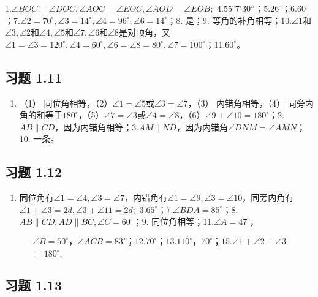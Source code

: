 1.\(\angle BOC = \angle DOC, \angle AOC = \angle EOC, \angle AOD = \angle EOB;\)
4.\(55^{\circ}7'30''\)；5.\(26^{\circ}\)；6.\(60^{\circ}\)；7.\(\angle 2 = 70^{\circ}, \angle 3 = 14^{\circ}, \angle 4 = 96^{\circ}, \angle 6 = 14^{\circ}\)；8.
是；9.
等角的补角相等；10.\(\angle 1\)和\(\angle 3, \angle 2\)和\(\angle 4, \angle 5\)和\(\angle 7, \angle 6\)和\(\angle 8\)是对顶角，又\(\angle 1 = \angle 3 = 120^{\circ}, \angle 4 = 60^{\circ}, \angle 6 = \angle 8 = 80^{\circ}, \angle 7 = 100^{\circ}\)；11.\(60^{\circ}\)。

\subsection{习题 1.11}

\begin{enumerate}
\item
  （1）
  同位角相等，（2）\(\angle 1 = \angle 5\)或\(\angle 3 = \angle 7\)，（3）
  内错角相等，（4）
  同旁内角的和等于\(180^{\circ}\)，（5）\(\angle 7 = \angle 3\)或\(\angle 4 = \angle 8\)，（6）\(\angle 9 + \angle 10 = 180^{\circ}\)；2.\(AB \parallel CD\)，因为内错角相等；3.\(AM \parallel ND\)，因为内错角\(\angle DNM = \angle AMN\)；10.
  一条。
\end{enumerate}

\subsection{习题 1.12}

\begin{enumerate}
\item
  同位角有\(\angle 1 = \angle 4, \angle 3 = \angle 7\)，内错角有\(\angle 1 = \angle 9, \angle 3 = \angle 10\)，同旁内角有\(\angle 1 + \angle 3 = 2d, \angle 3 + \angle 11 = 2d;\)
  3.\(65^\circ\)；7.\(\angle BDA = 85^\circ\)；8.\(AB \parallel CD, AD \parallel BC, \angle C = 60^\circ\)；9.
  同位角相等；11.\(\angle A = 47^\circ\)，
\end{enumerate}

\[
\begin{array}{l} \angle B = 50 ^{\circ}\text{，} \angle ACB = 83 ^{\circ}\text{；} 12.70 ^{\circ}\text{；} 13.110 ^{\circ}\text{，} 70 ^{\circ}\text{；} 15. \angle 1 + \angle 2 + \angle 3 \\ = 180 ^{\circ}. \end{array}
\]

\subsection{习题 1.13}

